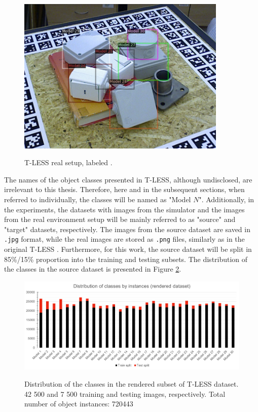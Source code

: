 \begin{figure}[htb]
	\begin{center}
		\includegraphics[width=10cm]{./tless_real_annotated.png}
	\end{center}
	\caption{T-LESS real setup, labeled
\cite{hodan2017tless}.}
	\begin{center}
		\label{tless_real_example}
	\end{center}
\end{figure}
\FloatBarrier

The names of the object classes presented in T-LESS, although undisclosed, are irrelevant to this thesis. Therefore, here and in the subsequent sections, when referred to individually, the classes will be named as "Model $N$". Additionally, in the experiments, the datasets with images from the simulator and the images from the real environment setup will be mainly referred to as "source" and "target" datasets, respectively. The images from the source dataset are saved in \texttt{.jpg} format, while the real images are stored as \texttt{.png} files, similarly as in the original T-LESS \cite{hodan2017tless}. Furthermore, for this work, the source dataset will be split in 85\%/15\%  proportion into the training and testing subsets. The distribution of the classes in the source dataset is presented in Figure \ref{tless_distribution_rend}.  

\begin{figure}[htb]
	\begin{center}
		\includegraphics[width=14cm]{./rendered_distribution.png}
	\end{center}
	\caption{Distribution of the classes in the rendered subset of T-LESS dataset. 42 500 and 7 500 training and testing images, respectively. Total number of object instances: 720443}
	\begin{center}
		\label{tless_distribution_rend}
	\end{center}
\end{figure}
\FloatBarrier

